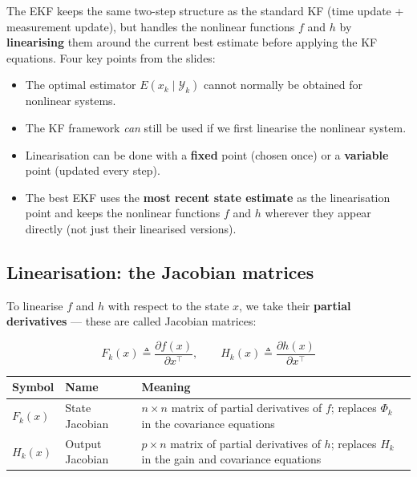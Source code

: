 \documentclass[12pt, a4paper]{article}
\begin{document}
The EKF keeps the same two-step structure as the standard KF
(time update + measurement update), but handles the nonlinear functions
$f$ and $h$ by \textbf{linearising} them around the current best
estimate before applying the KF equations.
Four key points from the slides:

\begin{itemize}[leftmargin=1.4em, topsep=2pt]
  \item The optimal estimator $E(x_k \mid \mathcal{Y}_k)$ cannot
        normally be obtained for nonlinear systems.
  \item The KF framework \emph{can} still be used if we first
        linearise the nonlinear system.
  \item Linearisation can be done with a \textbf{fixed} point
        (chosen once) or a \textbf{variable} point (updated every step).
  \item The best EKF uses the \textbf{most recent state estimate} as
        the linearisation point and keeps the nonlinear functions $f$
        and $h$ wherever they appear directly (not just their
        linearised versions).
\end{itemize}

\subsection*{Linearisation: the Jacobian matrices}

To linearise $f$ and $h$ with respect to the state $x$, we take their
\textbf{partial derivatives} --- these are called Jacobian matrices:

\[
  F_k(x) \triangleq \frac{\partial f(x)}{\partial x^\top}, \qquad
  H_k(x) \triangleq \frac{\partial h(x)}{\partial x^\top}
\]

\begin{center}
\renewcommand{\arraystretch}{1.4}
\begin{tabular}{p{1.8cm} p{3.2cm} p{7.5cm}}
  \toprule
  \textbf{Symbol} & \textbf{Name} & \textbf{Meaning} \\
  \midrule
  $F_k(x)$ & State Jacobian   & $n \times n$ matrix of partial derivatives of $f$; replaces $\Phi_k$ in the covariance equations \\
  $H_k(x)$ & Output Jacobian  & $p \times n$ matrix of partial derivatives of $h$; replaces $H_k$ in the gain and covariance equations \\
  \bottomrule
\end{tabular}
\end{center}
\end{document}
